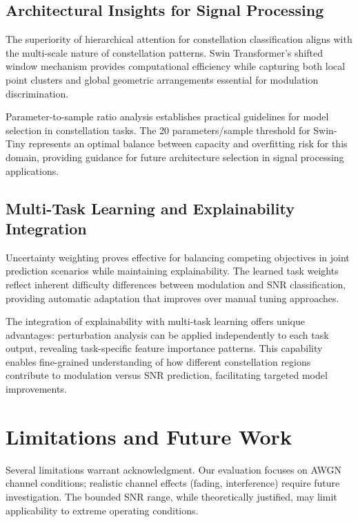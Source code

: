 \documentclass{ELSP}
\begin{document}
{{\subsection{Architectural Insights for Signal Processing}

The superiority of hierarchical attention for constellation classification aligns with the multi-scale nature of constellation patterns. Swin Transformer's shifted window mechanism provides computational efficiency while capturing both local point clusters and global geometric arrangements essential for modulation discrimination.

Parameter-to-sample ratio analysis establishes practical guidelines for model selection in constellation tasks. The 20 parameters/sample threshold for Swin-Tiny represents an optimal balance between capacity and overfitting risk for this domain, providing guidance for future architecture selection in signal processing applications.

\subsection{Multi-Task Learning and Explainability Integration}

Uncertainty weighting proves effective for balancing competing objectives in joint prediction scenarios while maintaining explainability. The learned task weights reflect inherent difficulty differences between modulation and SNR classification, providing automatic adaptation that improves over manual tuning approaches.

The integration of explainability with multi-task learning offers unique advantages: perturbation analysis can be applied independently to each task output, revealing task-specific feature importance patterns. This capability enables fine-grained understanding of how different constellation regions contribute to modulation versus SNR prediction, facilitating targeted model improvements.

\section{Limitations and Future Work}

Several limitations warrant acknowledgment. Our evaluation focuses on AWGN channel conditions; realistic channel effects (fading, interference) require future investigation. The bounded SNR range, while theoretically justified, may limit applicability to extreme operating conditions.

}}
\end{document}
